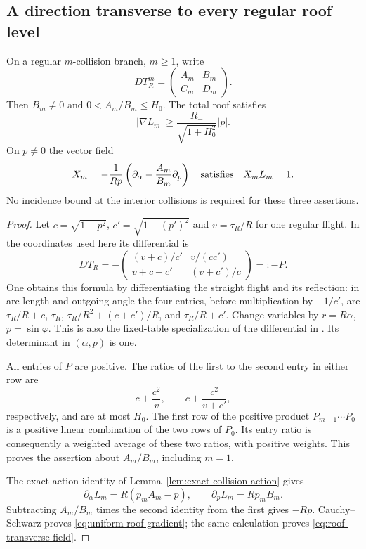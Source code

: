 \subsection{A direction transverse to every regular roof level}
\begin{lemma}\label{lem:roof-transverse-direction}
On a regular $m$-collision branch, $m\ge1$, write
\[
 D T_R^m=\begin{pmatrix}A_m&B_m\\ C_m&D_m\end{pmatrix}.
\]
Then $B_m\ne0$ and $0<A_m/B_m\le H_0$. The total roof satisfies
\begin{equation}\label{eq:uniform-roof-gradient}
 |\nabla L_m|\ge \frac{R_-}{\sqrt{1+H_0^2}}|p|.
\end{equation}
On $p\ne0$ the vector field
\begin{equation}\label{eq:roof-transverse-field}
 X_m=-\frac1{Rp}\left(\partial_\alpha-
                      \frac{A_m}{B_m}\partial_p\right)
 \quad\hbox{satisfies}\quad X_m L_m=1.
\end{equation}
No incidence bound at the interior collisions is required for these
three assertions.
\end{lemma}
\begin{proof}
Let $c=\sqrt{1-p^2}$, $c'=\sqrt{1-(p')^2}$ and $v=\tau_R/R$ for
one regular flight. In the coordinates used here its differential is
\begin{equation}\label{eq:positive-collision-matrix}
 D T_R=-\begin{pmatrix}
 (v+c)/c'&v/(cc')\\
 v+c+c'&(v+c')/c
 \end{pmatrix}=:-P.
\end{equation}
One obtains this formula by differentiating the straight flight and
its reflection: in arc length and outgoing angle the four entries,
before multiplication by $-1/c'$, are
$\tau_R/R+c$, $\tau_R$, $\tau_R/R^2+(c+c')/R$, and
$\tau_R/R+c'$. Change variables by $r=R\alpha$, $p=\sin\varphi$.
This is also the fixed-table specialization of the differential in
\cite[Section 3.1]{SYZ}. Its determinant in $(\alpha,p)$ is one.

All entries of $P$ are positive. The ratios of the first to the second
entry in either row are
\[
 c+\frac{c^2}{v},\qquad c+\frac{c^2}{v+c'},
\]
respectively, and are at most $H_0$. The first row of the positive
product $P_{m-1}\cdots P_0$ is a positive linear combination of the
two rows of $P_0$. Its entry ratio is consequently a weighted average
of these two ratios, with positive weights. This proves the assertion
about $A_m/B_m$, including $m=1$.

The exact action identity of Lemma~\ref{lem:exact-collision-action}
gives
\[
 \partial_\alpha L_m=R(p_m A_m-p),\qquad
 \partial_p L_m=Rp_m B_m.
\]
Subtracting $A_m/B_m$ times the second identity from the first gives
$-Rp$. Cauchy--Schwarz proves \eqref{eq:uniform-roof-gradient}; the
same calculation proves \eqref{eq:roof-transverse-field}.
\end{proof}

